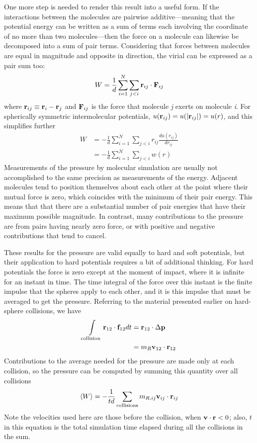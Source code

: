 \documentclass[9pt,bestpractices]{molsim}
\begin{document}
One more step is needed to render this result into a useful form. If the
interactions between the molecules are pairwise additive---meaning that
the potential energy can be written as a sum of terms each involving the
coordinate of no more than two molecules---then the force on a molecule
can likewise be decomposed into a sum of pair terms. Considering that
forces between molecules are equal in magnitude and opposite in
direction, the virial can be expressed as a pair sum too:
\[W = \frac{1}{d}\sum\limits_{i = 1}^N {\sum\limits_{j < i} {{{\bf{r}}_{ij}} \cdot {{\bf{F}}_{ij}}} } \]
where ${{\bf{r}}_{ij}} \equiv {{\bf{r}}_i} - {{\bf{r}}_j}$ and ${\bf F}_{ij}$ is the force that molecule
\emph{j} exerts on molecule \emph{i}. For spherically symmetric
intermolecular potentials, $u({{\bf{r}}_{ij}}) = u(|{{\bf{r}}_{ij}}|) = u(r)$, and this simplifies further
\begin{align*}
W &=  - \frac{1}{d}\sum\limits_{i = 1}^N {\sum\limits_{j < i} {{r_{ij}}\frac{{du({r_{ij}})}}{{d{r_{ij}}}}} } \\
 &=  - \frac{1}{d}\sum\limits_{i = 1}^N {\sum\limits_{j < i} {w(r)} } 
\end{align*}
Measurements of the pressure by molecular simulation are usually not
accomplished to the same precision as measurements of the energy.
Adjacent molecules tend to position themselves about each other at the
point where their mutual force is zero, which coincides with the minimum
of their pair energy. This means that that there are a substantial
number of pair energies that have their maximum possible magnitude. In
contrast, many contributions to the pressure are from pairs having
nearly zero force, or with positive and negative contributions that tend
to cancel.

These results for the pressure are valid equally to hard and soft
potentials, but their application to hard potentials requires a bit of
additional thinking. For hard
potentials the force is zero except at the moment of impact, where it is
infinite for an instant in time. The time integral of the force over
this instant is the finite impulse that the spheres apply to each other,
and it is this impulse that must be averaged to get the pressure.
Referring to the material presented earlier on hard-sphere collisions,
we have
\begin{align*}
\int\limits_{\rm{collision}} {{{\bf{r}}_{12}} \cdot {{\bf{f}}_{12}}dt}  &= {{\bf{r}}_{12}} \cdot \Delta {\bf{p}}\\
 &= {m_R}{{\bf{v}}_{12}} \cdot {{\bf{r}}_{12}}
\end{align*}
Contributions to the average needed for the pressure are made only at
each collision, so the pressure can be computed by summing this quantity
over all collisions
\[\left\langle W \right\rangle  =  - \frac{1}{{td}}\sum\limits_{\rm collisions} {{m_{R,ij}}{{\bf{v}}_{ij}} \cdot {{\bf{r}}_{ij}}} \]
Note the velocities used here are those before the collision, when ${\bf{v}} \cdot {\bf{r}} < 0$;
also, $t$ in this equation is the total simulation time elapsed
during all the collisions in the sum.
\end{document}
